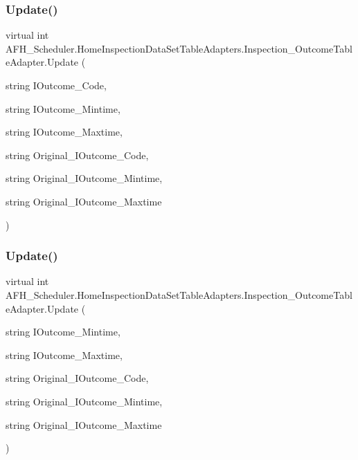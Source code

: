 \subsubsection{Update()\hspace{0.1cm}{\footnotesize\ttfamily [5/6]}}
{\footnotesize\ttfamily virtual int A\+F\+H\+\_\+\+Scheduler.\+Home\+Inspection\+Data\+Set\+Table\+Adapters.\+Inspection\+\_\+\+Outcome\+Table\+Adapter.\+Update (\begin{DoxyParamCaption}\item[{string}]{I\+Outcome\+\_\+\+Code,  }\item[{string}]{I\+Outcome\+\_\+\+Mintime,  }\item[{string}]{I\+Outcome\+\_\+\+Maxtime,  }\item[{string}]{Original\+\_\+\+I\+Outcome\+\_\+\+Code,  }\item[{string}]{Original\+\_\+\+I\+Outcome\+\_\+\+Mintime,  }\item[{string}]{Original\+\_\+\+I\+Outcome\+\_\+\+Maxtime }\end{DoxyParamCaption})\hspace{0.3cm}{\ttfamily [virtual]}}

\mbox{\label{class_a_f_h___scheduler_1_1_home_inspection_data_set_table_adapters_1_1_inspection___outcome_table_adapter_a6d7fe4f75d764da24a7b84596c58c6ab}} 
\subsubsection{Update()\hspace{0.1cm}{\footnotesize\ttfamily [6/6]}}
{\footnotesize\ttfamily virtual int A\+F\+H\+\_\+\+Scheduler.\+Home\+Inspection\+Data\+Set\+Table\+Adapters.\+Inspection\+\_\+\+Outcome\+Table\+Adapter.\+Update (\begin{DoxyParamCaption}\item[{string}]{I\+Outcome\+\_\+\+Mintime,  }\item[{string}]{I\+Outcome\+\_\+\+Maxtime,  }\item[{string}]{Original\+\_\+\+I\+Outcome\+\_\+\+Code,  }\item[{string}]{Original\+\_\+\+I\+Outcome\+\_\+\+Mintime,  }\item[{string}]{Original\+\_\+\+I\+Outcome\+\_\+\+Maxtime }\end{DoxyParamCaption})\hspace{0.3cm}{\ttfamily [virtual]}}



